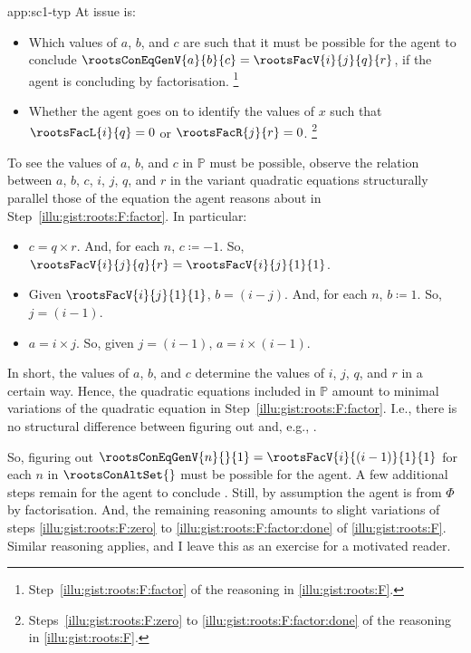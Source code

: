 \begin{note}
\begin{dets}{app:sc1-typ}
    At issue is:
    \begin{itemize}
    \item
      Which values of \(a\), \(b\), and \(c\) are such that it must be possible for the agent to conclude \(\rootsConEqGenV{a}{b}{c} = \rootsFacV{i}{j}{q}{r}\), if the agent is concluding by factorisation.%
    \footnote{
      Step~\ref{illu:gist:roots:F:factor} of the \agents{} reasoning in \autoref{illu:gist:roots:F}.
    }
    \item
      Whether the agent goes on to identify the values of \(x\) such that \(\rootsFacL{i}{q} = 0\) or \(\rootsFacR{j}{r} = 0\).%
    \footnote{
      Steps~\ref{illu:gist:roots:F:zero} to \ref{illu:gist:roots:F:factor:done} of the \agents{} reasoning in \autoref{illu:gist:roots:F}.
    }
    \end{itemize}
    \smallskip

    \noindent%
    To see the values of \(a\), \(b\), and \(c\) in \(\mathbb{P}\) must be possible, observe the relation between \(a\), \(b\), \(c\), \(i\), \(j\), \(q\), and \(r\) in the variant quadratic equations structurally parallel those of the equation the agent reasons about in Step~\ref{illu:gist:roots:F:factor}.
    In particular:
    \begin{itemize}
    \item
      \(c = q \times r\).
      And, for each \(n\), \(c \coloneq -1\).
      So, \(\rootsFacV{i}{j}{q}{r} =\rootsFacV{i}{j}{1}{1}\).
    \item
      Given \(\rootsFacV{i}{j}{1}{1}\), \(b = (i - j)\).
      And, for each \(n\), \(b \coloneq 1\).
      So, \(j = (i - 1)\).
    \item
      \(a = i \times j\).
      So, given \(j = (i - 1)\), \(a = i \times (i - 1)\).
    \end{itemize}
    In short, the values of \(a\), \(b\), and \(c\) determine the values of \(i\), \(j\), \(q\), and \(r\) in a certain way.
    Hence, the quadratic equations included in \(\mathbb{P}\) amount to minimal variations of the quadratic equation in Step~\ref{illu:gist:roots:F:factor}.
    I.e., there is no structural difference between figuring out  and, e.g., .
    \smallskip

    \noindent%
    So, figuring out \(\rootsConEqGenV{n}{}{1} = \rootsFacV{i}{(i - 1)}{1}{1}\) for each \(n\) in \(\rootsConAltSet{}\) must be possible for the agent.
    A few additional steps remain for the agent to conclude .
    Still, by assumption the agent is \tCV{}  from \(\Phi\) by factorisation.
    And, the remaining reasoning amounts to slight variations of steps \ref{illu:gist:roots:F:zero} to \ref{illu:gist:roots:F:factor:done} of \autoref{illu:gist:roots:F}.
    Similar reasoning applies, and I leave this as an exercise for a motivated reader.
    \medskip


\end{dets}
\end{note}
